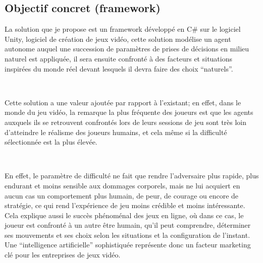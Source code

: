 \subsection{Objectif concret (framework)}

La solution que je propose est un framework développé en C\# sur le logiciel Unity, logiciel de création de jeux vidéo, cette solution modélise un agent autonome auquel une succession de paramètres de prises de décisions en milieu naturel est appliquée, il sera ensuite confronté à des facteurs et situations inspirées du monde réel devant lesquels il devra faire des choix “naturels”.

~\par
Cette solution a une valeur ajoutée par rapport à l'existant; en effet, dans le monde du jeu vidéo, la remarque la plus fréquente des joueurs est que les agents auxquels ils se retrouvent confrontés lors de leurs sessions de jeu sont très loin d’atteindre le réalisme des joueurs humains, et cela même si la difficulté sélectionnée est la plus élevée.

~\par
En effet, le paramètre de difficulté ne fait que rendre l’adversaire plus rapide, plus endurant et moins sensible aux dommages corporels,  mais ne lui acquiert en aucun cas un comportement plus humain, de peur, de courage ou encore de stratégie, ce qui rend l'expérience de jeu moins crédible et moins intéressante. Cela explique aussi le succès phénoménal des jeux en ligne, où dans ce cas, le joueur est confronté à un autre être humain, qu’il peut comprendre, déterminer ses mouvements et ses choix selon les situations et la configuration de l’instant. Une “intelligence artificielle” sophistiquée représente donc un facteur marketing clé pour les entreprises de jeux vidéo. 

